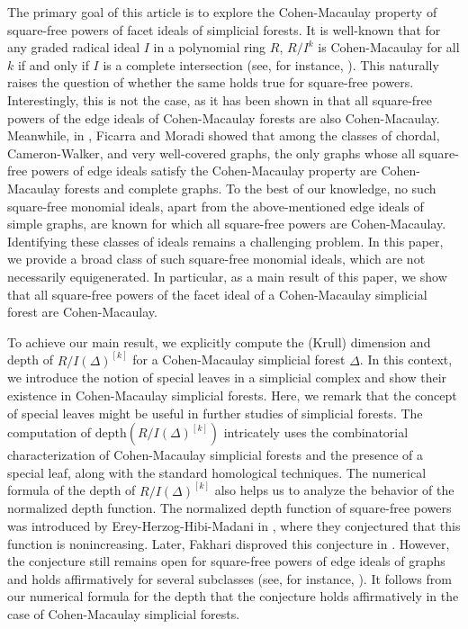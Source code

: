 \documentclass[12pt,a4paper,reqno]{amsart}
\theoremstyle{definition}
\def\D{\Delta}
\def\d{\mathrm{depth}}
\begin{document}
The primary goal of this article is to explore the Cohen-Macaulay property of square-free powers of facet ideals of simplicial forests. It is well-known that for any graded radical ideal $I$ in a polynomial ring $R$, $R/I^k$ is Cohen-Macaulay for all $k$ if and only if $I$ is a complete intersection (see, for instance, \cite{CowsikNori}). This naturally raises the question of whether the same holds true for square-free powers. Interestingly, this is not the case, as it has been shown in \cite{DRS12024} that all square-free powers of the edge ideals of Cohen-Macaulay forests are also Cohen-Macaulay. Meanwhile, in \cite{MF2024}, Ficarra and Moradi showed that among the classes of chordal, Cameron-Walker, and very well-covered graphs, the only graphs whose all square-free powers of edge ideals satisfy the Cohen-Macaulay property are Cohen-Macaulay forests and complete graphs. To the best of our knowledge, no such square-free monomial ideals, apart from the above-mentioned edge ideals of simple graphs, are known for which all square-free powers are Cohen-Macaulay. Identifying these classes of ideals remains a challenging problem. In this paper, we provide a broad class of such square-free monomial ideals, which are not necessarily equigenerated. In particular, as a main result of this paper, we show that all square-free powers of the facet ideal of a Cohen-Macaulay simplicial forest are Cohen-Macaulay. 

To achieve our main result, we explicitly compute the (Krull) dimension and depth of $R/I(\Delta)^{[k]}$ for a Cohen-Macaulay simplicial forest $\Delta$. In this context, we introduce the notion of special leaves in a simplicial complex and show their existence in Cohen-Macaulay simplicial forests. Here, we remark that the concept of special leaves might be useful in further studies of simplicial forests. The computation of $\d(R/I(\D)^{[k]})$ intricately uses the combinatorial characterization of Cohen-Macaulay simplicial forests and the presence of a special leaf, along with the standard homological techniques. The numerical formula of the depth of $R/I(\Delta)^{[k]}$ also helps us to analyze the behavior of the normalized depth function. The normalized depth function of square-free powers was introduced by Erey-Herzog-Hibi-Madani in \cite{EHHM12}, where they conjectured that this function is nonincreasing. Later, Fakhari disproved this conjecture in \cite{Fakhari_increasing}. However, the conjecture still remains open for square-free powers of edge ideals of graphs and holds affirmatively for several subclasses (see, for instance, \cite{CFL1, MF2024}). It follows from our numerical formula for the depth that the conjecture holds affirmatively in the case of Cohen-Macaulay simplicial forests. 
\end{document}
